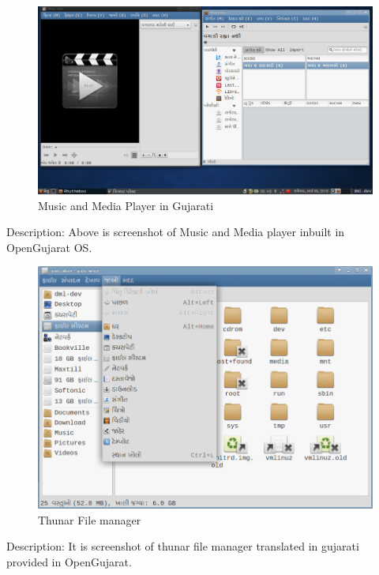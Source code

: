 \newpage
\begin{figure}[h]
\begin{center}
  \includegraphics[scale=0.33] {12.png}
  \caption[Screenshot - Music and Media player in OpenGujarat]{Music and Media Player in Gujarati}
\end{center}
\end{figure}
Description:  Above is screenshot of Music and Media player inbuilt in OpenGujarat OS.

\newpage

\begin{figure}[h]
\begin{center}
  \includegraphics[scale=0.4] {13.png}
 \caption[Screenshot - Thunar File manager]{Thunar File manager}
\end{center}
\end{figure}
Description: It is screenshot of thunar file manager translated in gujarati provided in OpenGujarat.

